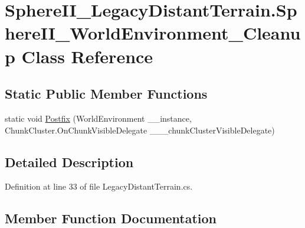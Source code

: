 \hypertarget{class_sphere_i_i___legacy_distant_terrain_1_1_sphere_i_i___world_environment___cleanup}{}\section{Sphere\+I\+I\+\_\+\+Legacy\+Distant\+Terrain.\+Sphere\+I\+I\+\_\+\+World\+Environment\+\_\+\+Cleanup Class Reference}
\label{class_sphere_i_i___legacy_distant_terrain_1_1_sphere_i_i___world_environment___cleanup}
\subsection*{Static Public Member Functions}
\begin{DoxyCompactItemize}
\item 
static void \mbox{\hyperlink{class_sphere_i_i___legacy_distant_terrain_1_1_sphere_i_i___world_environment___cleanup_ad34f5ecd8003dea78951bdc158cd15a4}{Postfix}} (World\+Environment \+\_\+\+\_\+instance, Chunk\+Cluster.\+On\+Chunk\+Visible\+Delegate \+\_\+\+\_\+\+\_\+chunk\+Cluster\+Visible\+Delegate)
\end{DoxyCompactItemize}


\subsection{Detailed Description}


Definition at line 33 of file Legacy\+Distant\+Terrain.\+cs.



\subsection{Member Function Documentation}
\mbox{\label{class_sphere_i_i___legacy_distant_terrain_1_1_sphere_i_i___world_environment___cleanup_ad34f5ecd8003dea78951bdc158cd15a4}} 

